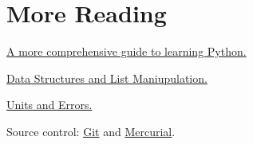 \documentclass[justified, nobib]{tufte-handout}
\newcommand{\listTutorialLink}
  {https://docs.python.org/2/tutorial/datastructures.html}
\newcommand{\pintLink}{http://pint.readthedocs.org/en/0.6/}
\newcommand{\hgLink}{http://mercurial.selenic.com/}
\newcommand{\gitLink}{http://git-scm.com/}
\newcommand{\lambdaTutorialLink}
  {https://pythonconquerstheuniverse.wordpress.com/2011/08/29/lambda_tutorial/}
\newcommand{\functionalProgrammingLink}
  {http://www.ibm.com/developerworks/library/l-prog/}
\begin{document}
\section*{More Reading}
\begin{description}
\item \href{http://learnpythonthehardway.org/book/}{A more comprehensive guide to learning Python.}

\item \href{\listTutorialLink}{Data Structures and List Maniupulation.}

\item \href{\pintLink}{Units and Errors.}

\item Source control: \href{\gitLink}{Git} and \href{\hgLink}{Mercurial}.


\end{description}
\end{document}
